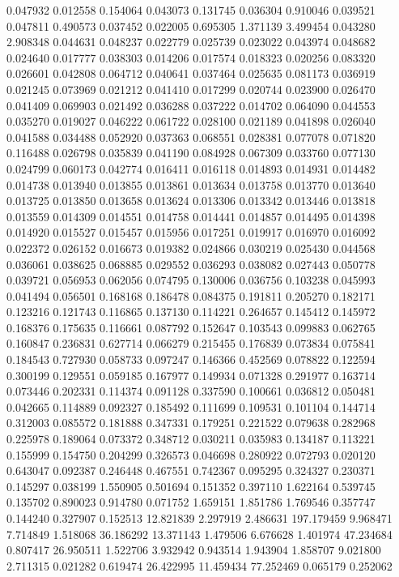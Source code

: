 0.047932
0.012558
0.154064
0.043073
0.131745
0.036304
0.910046
0.039521
0.047811
0.490573
0.037452
0.022005
0.695305
1.371139
3.499454
0.043280
2.908348
0.044631
0.048237
0.022779
0.025739
0.023022
0.043974
0.048682
0.024640
0.017777
0.038303
0.014206
0.017574
0.018323
0.020256
0.083320
0.026601
0.042808
0.064712
0.040641
0.037464
0.025635
0.081173
0.036919
0.021245
0.073969
0.021212
0.041410
0.017299
0.020744
0.023900
0.026470
0.041409
0.069903
0.021492
0.036288
0.037222
0.014702
0.064090
0.044553
0.035270
0.019027
0.046222
0.061722
0.028100
0.021189
0.041898
0.026040
0.041588
0.034488
0.052920
0.037363
0.068551
0.028381
0.077078
0.071820
0.116488
0.026798
0.035839
0.041190
0.084928
0.067309
0.033760
0.077130
0.024799
0.060173
0.042774
0.016411
0.016118
0.014893
0.014931
0.014482
0.014738
0.013940
0.013855
0.013861
0.013634
0.013758
0.013770
0.013640
0.013725
0.013850
0.013658
0.013624
0.013306
0.013342
0.013446
0.013818
0.013559
0.014309
0.014551
0.014758
0.014441
0.014857
0.014495
0.014398
0.014920
0.015527
0.015457
0.015956
0.017251
0.019917
0.016970
0.016092
0.022372
0.026152
0.016673
0.019382
0.024866
0.030219
0.025430
0.044568
0.036061
0.038625
0.068885
0.029552
0.036293
0.038082
0.027443
0.050778
0.039721
0.056953
0.062056
0.074795
0.130006
0.036756
0.103238
0.045993
0.041494
0.056501
0.168168
0.186478
0.084375
0.191811
0.205270
0.182171
0.123216
0.121743
0.116865
0.137130
0.114221
0.264657
0.145412
0.145972
0.168376
0.175635
0.116661
0.087792
0.152647
0.103543
0.099883
0.062765
0.160847
0.236831
0.627714
0.066279
0.215455
0.176839
0.073834
0.075841
0.184543
0.727930
0.058733
0.097247
0.146366
0.452569
0.078822
0.122594
0.300199
0.129551
0.059185
0.167977
0.149934
0.071328
0.291977
0.163714
0.073446
0.202331
0.114374
0.091128
0.337590
0.100661
0.036812
0.050481
0.042665
0.114889
0.092327
0.185492
0.111699
0.109531
0.101104
0.144714
0.312003
0.085572
0.181888
0.347331
0.179251
0.221522
0.079638
0.282968
0.225978
0.189064
0.073372
0.348712
0.030211
0.035983
0.134187
0.113221
0.155999
0.154750
0.204299
0.326573
0.046698
0.280922
0.072793
0.020120
0.643047
0.092387
0.246448
0.467551
0.742367
0.095295
0.324327
0.230371
0.145297
0.038199
1.550905
0.501694
0.151352
0.397110
1.622164
0.539745
0.135702
0.890023
0.914780
0.071752
1.659151
1.851786
1.769546
0.357747
0.144240
0.327907
0.152513
12.821839
2.297919
2.486631
197.179459
9.968471
7.714849
1.518068
36.186292
13.371143
1.479506
6.676628
1.401974
47.234684
0.807417
26.950511
1.522706
3.932942
0.943514
1.943904
1.858707
9.021800
2.711315
0.021282
0.619474
26.422995
11.459434
77.252469
0.065179
0.252062
